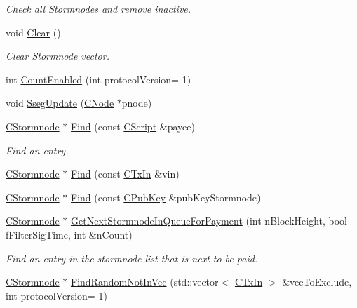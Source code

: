 \begin{DoxyCompactItemize}
\begin{DoxyCompactList}\small\item\em Check all Stormnodes and remove inactive. \end{DoxyCompactList}\item 
void \hyperlink{class_c_stormnode_man_aef04ea77a6774bf594f205362ba8f91d}{Clear} ()
\begin{DoxyCompactList}\small\item\em Clear Stormnode vector. \end{DoxyCompactList}\item 
int \hyperlink{class_c_stormnode_man_a02b9b11565e19f2c9dafbe132341fabd}{Count\+Enabled} (int protocol\+Version=-\/1)
\item 
void \hyperlink{class_c_stormnode_man_a3f8f9f86f01df701533b544903b55113}{Sseg\+Update} (\hyperlink{class_c_node}{C\+Node} $\ast$pnode)
\item 
\hyperlink{class_c_stormnode}{C\+Stormnode} $\ast$ \hyperlink{class_c_stormnode_man_a346025e5a78a04ddfa80252ea1433c72}{Find} (const \hyperlink{class_c_script}{C\+Script} \&payee)
\begin{DoxyCompactList}\small\item\em Find an entry. \end{DoxyCompactList}\item 
\hyperlink{class_c_stormnode}{C\+Stormnode} $\ast$ \hyperlink{class_c_stormnode_man_a64b6022d93220e65e739c5cf8ba74918}{Find} (const \hyperlink{class_c_tx_in}{C\+Tx\+In} \&vin)
\item 
\hyperlink{class_c_stormnode}{C\+Stormnode} $\ast$ \hyperlink{class_c_stormnode_man_a8daba6b955faaf839f9441b754bd7eef}{Find} (const \hyperlink{class_c_pub_key}{C\+Pub\+Key} \&pub\+Key\+Stormnode)
\item 
\hyperlink{class_c_stormnode}{C\+Stormnode} $\ast$ \hyperlink{class_c_stormnode_man_aeaaefff98af62a3d79d72e23f5539a72}{Get\+Next\+Stormnode\+In\+Queue\+For\+Payment} (int n\+Block\+Height, bool f\+Filter\+Sig\+Time, int \&n\+Count)
\begin{DoxyCompactList}\small\item\em Find an entry in the stormnode list that is next to be paid. \end{DoxyCompactList}\item 
\hyperlink{class_c_stormnode}{C\+Stormnode} $\ast$ \hyperlink{class_c_stormnode_man_a24417dae3da8762e9be495f25b0a6d30}{Find\+Random\+Not\+In\+Vec} (std\+::vector$<$ \hyperlink{class_c_tx_in}{C\+Tx\+In} $>$ \&vec\+To\+Exclude, int protocol\+Version=-\/1)

\end{DoxyCompactItemize}
